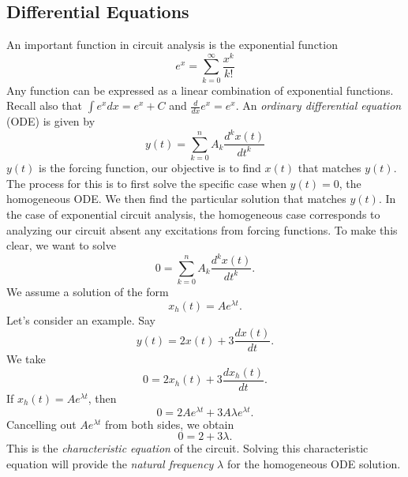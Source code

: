 \documentclass[nobib]{tufte-handout}
\begin{document}
\subsection{Differential Equations}

An important function in circuit analysis 
is the exponential function 
\begin{equation} \label{eq:41}
    e^x = \sum_{k=0}^\infty \frac{x^k}{k!}
\end{equation}
Any function can be expressed as a linear 
combination of exponential functions. Recall 
also that $\int e^x dx = e^x + C$ and 
$\frac{d}{dx} e^x = e^x$. 
An \emph{ordinary differential equation} (ODE)
is given by 
\begin{equation} \label{eq:42}
    y(t) = \sum_{k=0}^{n} A_k \frac{d^k x(t)}{dt^k}
\end{equation}
$y(t)$ is the forcing function, our objective is 
to find $x(t)$ that matches $y(t)$. The process for 
this is to first solve the specific case 
when $y(t) = 0$, the homogeneous ODE. We then 
find the particular solution that matches $y(t)$. 
In the case of exponential circuit analysis, the homogeneous
case corresponds to analyzing our circuit absent 
any excitations from forcing functions. To make this clear,
we want to solve 
\begin{equation} \label{eq:43}
    0 = \sum_{k=0}^{n} A_k \frac{d^k x(t)}{dt^k}.
\end{equation}
We assume a solution of the form
\begin{equation} \label{eq:44}
    x_h(t) = Ae^{\lambda t}.
\end{equation}
Let's consider an example. Say 
\begin{equation}
    y(t) = 2x(t) + 3 \frac{dx(t)}{dt}.
\end{equation}
We take 
\begin{equation}
    0 = 2x_h(t) + 3 \frac{dx_h(t)}{dt}.
\end{equation}
If $x_h(t) = A e^{\lambda t}$, 
then 
\begin{equation}
    0 = 2A e^{\lambda t} + 3 A \lambda e^{\lambda t}.
\end{equation}
Cancelling out $Ae^{\lambda t}$ from 
both sides, we obtain 
\begin{equation}
    0 = 2 + 3 \lambda.
\end{equation}
This is the \emph{characteristic equation}
of the circuit. Solving this characteristic 
equation will provide the \emph{natural frequency}
$\lambda$ for the homogeneous ODE solution. 
\end{document}
